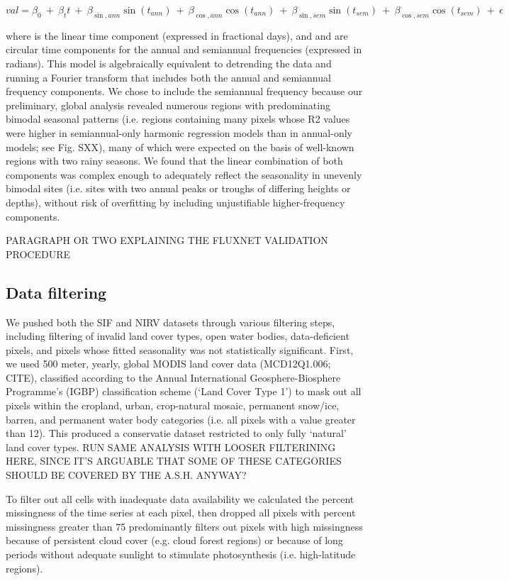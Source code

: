 \documentclass[9pt,twocolumn,twoside,lineno]{pnas-new}
\begin{document}
{$$val=\beta _0\ +\ \beta _tt\ +\ \beta _{\sin ,ann}\sin (t_{ann})\ +\ \beta _{\cos ,ann}\cos (t_{ann})\ +\ \beta _{\sin ,sem}\sin (t_{sem})\ +\ \beta _{\cos ,sem}\cos (t_{sem})\ +\ \epsilon$$

where  is the linear time component (expressed in fractional days), and 
and  are circular time components for the annual and semiannual
frequencies (expressed in radians). This model is algebraically
equivalent to detrending the data and running a Fourier transform that
includes both the annual and semiannual frequency components. We chose to
include the semiannual frequency because our preliminary, global analysis
revealed numerous regions with predominating bimodal seasonal patterns
(i.e. regions containing many pixels whose R2 values were higher in
semiannual-only harmonic regression models than in annual-only models;
see Fig. SXX), many of which were expected on the basis of well-known
regions with two rainy seasons. We found that the linear combination of
both components was complex enough to adequately reflect the seasonality
in unevenly bimodal sites (i.e. sites with two annual peaks or troughs of
differing heights or depths), without risk of overfitting by including
unjustifiable higher-frequency components.

PARAGRAPH OR TWO EXPLAINING THE FLUXNET VALIDATION PROCEDURE

\subsection*{Data filtering}
We pushed both the SIF and NIRV datasets through various filtering steps,
including filtering of invalid land cover types, open water bodies,
data-deficient pixels, and pixels whose fitted seasonality was not
statistically significant. First, we used 500 meter, yearly, global MODIS
land cover data (MCD12Q1.006; CITE), classified according to the Annual
International Geosphere-Biosphere Programme’s (IGBP) classification
scheme (‘Land Cover Type 1’) to mask out all pixels within the cropland,
urban, crop-natural mosaic, permanent snow/ice, barren, and permanent
water body categories (i.e. all pixels with a value greater than 12).
This produced a conservatie dataset restricted to only fully ‘natural’
land cover types. RUN SAME ANALYSIS WITH LOOSER FILTERINING HERE, SINCE
IT’S ARGUABLE THAT SOME OF THESE CATEGORIES SHOULD BE COVERED BY THE
A.S.H. ANYWAY?

To filter out all cells with inadequate data availability we calculated
the percent missingness of the time series at each pixel, then dropped
all pixels with percent missingness greater than 75%
predominantly filters out pixels with high missingness because of
persistent cloud cover (e.g. cloud forest regions) or because of long
periods without adequate sunlight to stimulate photosynthesis (i.e.
high-latitude regions).

}
\end{document}
